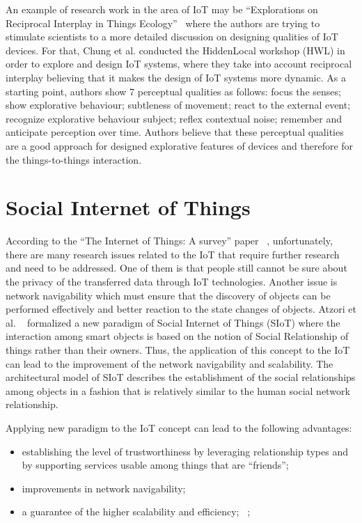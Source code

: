 \par An example of research work in the area of IoT may be “Explorations on Reciprocal
Interplay in Things Ecology”~\cite{chung2018explorations} where the authors are trying to
stimulate scientists to a more detailed discussion on designing qualities of IoT devices.
For that, Chung et al. conducted the HiddenLocal workshop (HWL) in order to explore and design
IoT systems, where they take into account reciprocal interplay believing that it makes the
design of IoT systems more dynamic.
As a starting point, authors show 7 perceptual qualities as follows: focus the senses;
show explorative behaviour; subtleness of movement; react to the external event;
recognize explorative behaviour subject; reflex contextual noise; remember and anticipate perception over time.
Authors believe that these perceptual qualities are a good approach for designed explorative
features of devices and therefore for the things-to-things interaction.

\section{Social Internet of Things}
\label{sec:Social Internet of Things}
According to the “The Internet of Things: A survey” paper ~\cite{atzori2010internet},
unfortunately, there are many research issues related to the IoT that require further
research and need to be addressed.
One of them is that people still cannot be sure about the privacy of the transferred data
through IoT technologies.
Another issue is network navigability which must ensure that the discovery of objects can be
performed effectively and better reaction to the state changes of objects.
Atzori et al. ~\cite{atzori2011siot} formalized a new paradigm of Social Internet of Things (SIoT)
where the interaction among smart objects is based on the notion of Social
Relationship of things rather than their owners.
Thus, the application of this concept to the IoT can lead to the improvement
of the network navigability and scalability.
The architectural model of SIoT describes the establishment of the social relationships
among objects in a fashion that is relatively similar to the human social network relationship.

\par Applying new paradigm to the IoT concept can lead to the following advantages: 
\begin{itemize}
  \item establishing the level of trustworthiness by leveraging relationship types and by supporting services usable among things that are “friends”;
  \item improvements in network navigability; 
  \item a guarantee of the higher scalability and efficiency; ~\cite{atzori2012social};
\end{itemize}

